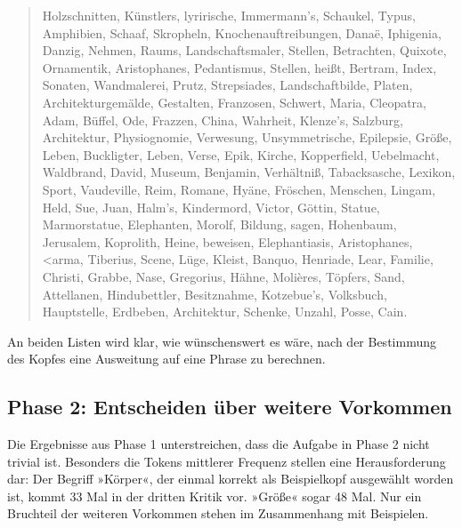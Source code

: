 \documentclass{article}
\begin{document}
\begin{quote}
  Holzschnitten, Künstlers, lyrirische, Immermann's, Schaukel, Typus,
  Amphibien, Schaaf, Skropheln, Knochenauftreibungen, Danaë,
  Iphigenia, Danzig, Nehmen, Raums, Landschaftsmaler, Stellen,
  Betrachten, Quixote, Ornamentik, Aristophanes, Pedantismus, Stellen,
  heißt, Bertram, Index, Sonaten, Wandmalerei, Prutz, Strepsiades,
  Landschaftbilde, Platen, Architekturgemälde, Gestalten, Franzosen,
  Schwert, Maria, Cleopatra, Adam, Büffel, Ode, Frazzen, China,
  Wahrheit, Klenze's, Salzburg, Architektur, Physiognomie, Verwesung,
  Unsymmetrische, Epilepsie, Größe, Leben, Buckligter, Leben, Verse,
  Epik, Kirche, Kopperfield, Uebelmacht, Waldbrand, David, Museum,
  Benjamin, Verhältniß, Tabacksasche, Lexikon, Sport, Vaudeville,
  Reim, Romane, Hyäne, Fröschen, Menschen, Lingam, Held, Sue, Juan,
  Halm's, Kindermord, Victor, Göttin, Statue, Marmorstatue,
  Elephanten, Morolf, Bildung, sagen, Hohenbaum, Jerusalem, Koprolith,
  Heine, beweisen, Elephantiasis, Aristophanes,
  \foreignlanguage{polutonikogreek}{<arma}, %
  Tiberius, Scene, Lüge, Kleist, Banquo, Henriade, Lear, Familie,
  Christi, Grabbe, Nase, Gregorius, Hähne, Molières, Töpfers, Sand,
  Attellanen, Hindubettler, Besitznahme, Kotzebue's, Volksbuch,
  Hauptstelle, Erdbeben, Architektur, Schenke, Unzahl, Posse, Cain.
\end{quote}

An beiden Listen wird klar, wie wünschenswert es wäre, nach der
Bestimmung des Kopfes eine Ausweitung auf eine Phrase zu berechnen.

\subsection{Phase 2: Entscheiden über weitere Vorkommen}

Die Ergebnisse aus Phase 1 unterstreichen, dass die Aufgabe in Phase 2
nicht trivial ist. Besonders die Tokens mittlerer Frequenz stellen
eine Herausforderung dar: Der Begriff »Körper«, der einmal korrekt als
Beispielkopf ausgewählt worden ist, kommt 33 Mal in der dritten Kritik
vor. »Größe« sogar 48 Mal. Nur ein Bruchteil der weiteren Vorkommen
stehen im Zusammenhang mit Beispielen.
\end{document}
